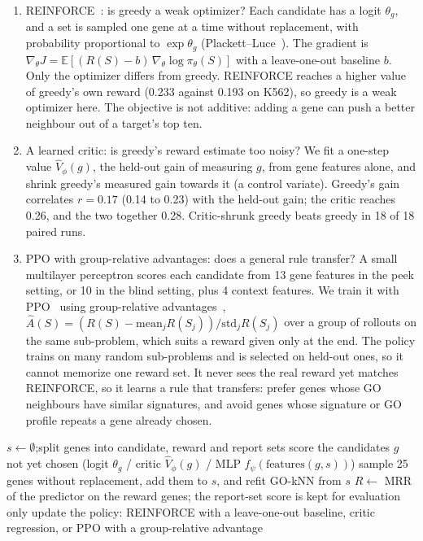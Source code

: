 \documentclass[11pt, letterpaper]{cmu}
\begin{document}
\begin{enumerate}[leftmargin=1.5em,itemsep=3pt,topsep=2pt]
\item REINFORCE~\citep{williams1992reinforce}: is greedy a weak optimizer? Each candidate has a
logit $\theta_g$, and a set is sampled one gene at a time without replacement, with probability
proportional to $\exp\theta_g$ (Plackett--Luce~\citep{plackett1975luce}). The gradient is
$\nabla_\theta J=\mathbb{E}[(R(S)-b)\,\nabla_\theta\log\pi_\theta(S)]$ with a leave-one-out
baseline $b$. Only the optimizer differs from greedy. REINFORCE reaches a higher value of
greedy's own reward (0.233 against 0.193 on K562), so greedy is a weak optimizer here. The
objective is not additive: adding a gene can push a better neighbour out of a target's top ten.
\item A learned critic: is greedy's reward estimate too noisy? We fit a one-step value
$\hat V_\phi(g)$, the held-out gain of measuring $g$, from gene features alone, and shrink
greedy's measured gain towards it (a control variate). Greedy's gain correlates $r{=}0.17$ (0.14
to 0.23) with the held-out gain; the critic reaches 0.26, and the two together 0.28.
Critic-shrunk greedy beats greedy in 18 of 18 paired runs.
\item PPO with group-relative advantages: does a general rule transfer? A small multilayer
perceptron scores each candidate from 13 gene features in the peek setting, or 10 in the blind
setting, plus 4 context features. We train it with PPO~\citep{schulman2017ppo} using
group-relative advantages~\citep{shao2024grpo},
$\hat A(S)=(R(S)-\mathrm{mean}_j R(S_j))/\mathrm{std}_j R(S_j)$ over a group of rollouts on the
same sub-problem, which suits a reward given only at the end. The policy trains on many random
sub-problems and is selected on held-out ones, so it cannot memorize one reward set. It never
sees the real reward yet matches REINFORCE, so it learns a rule that transfers: prefer genes
whose GO neighbours have similar signatures, and avoid genes whose signature or GO profile
repeats a gene already chosen.
\end{enumerate}

\begin{algorithm}[h]
\small
\caption{One acquisition episode, shared by all three methods}
\label{alg:episode}
\begin{algorithmic}[1]
\State $s \gets \emptyset$;\quad split genes into candidate, reward and report sets
  \State score the candidates $g$ not yet chosen
  (logit $\theta_g$ / critic $\hat V_\phi(g)$ / MLP $f_\psi(\text{features}(g,s))$)
  \State sample 25 genes without replacement, add them to $s$, and refit GO-kNN from $s$
\EndFor
\State $R \gets$ MRR of the predictor on the reward genes; the report-set score is kept for evaluation only
\State update the policy: REINFORCE with a leave-one-out baseline, critic regression, or PPO with a group-relative advantage
\end{algorithmic}
\end{algorithm}
\end{document}
